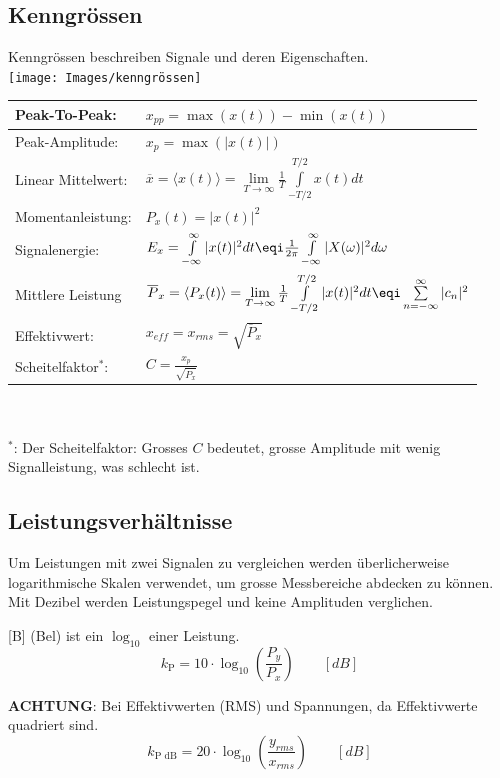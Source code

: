 \subsection{Kenngrössen} 
 Kenngrössen beschreiben Signale und deren Eigenschaften.\\
\texttt{[image: Images/kenngrössen]}

\begin{tabular}{m{3cm} m{5cm}}
		Peak-To-Peak: & $x_{pp} = \max(x(t)) - \min(x(t))$ \\ \midrule
		Peak-Amplitude: & $x_p = \max(|x(t)|)$ \\\midrule
		Linear Mittelwert: & $\overline{x} = \langle x(t)\rangle = \lim\limits_{T\rightarrow\infty}\frac{1}{T}\int\limits_{-T/2}^{T/2}x(t)dt$ \\\midrule
		Momentanleistung: & $P_x(t) = |x(t)|^2$ \\\midrule
		Signalenergie: & $E_x = \int\limits_{-\infty}^{\infty}|x(t)|^2 dt \eqi \frac{1}{2\pi}\int\limits_{-\infty}^{\infty}|X(\omega)|^2d\omega$ \\\midrule
		Mittlere Leistung & $\overline{P}_x = \langle P_x(t)\rangle = \lim\limits_{T\rightarrow\infty}\frac{1}{T}\int\limits_{-T/2}^{T/2}|x(t)|^2dt \eqi \sum\limits_{n=-\infty}^{\infty}|c_n|^2$  \\\midrule
		Effektivwert: & $x_{eff} = x_{rms} = \sqrt{\overline{P}_x}$ \\\midrule
		Scheitelfaktor$^*$: & $C = \frac{x_p}{\sqrt{\overline{P}_x}}$
\end{tabular}
~\\ \\
$^*$: Der Scheitelfaktor: Grosses $C$ bedeutet, grosse Amplitude mit wenig Signalleistung, was schlecht ist.


\subsection{Leistungsverhältnisse}
Um Leistungen mit zwei Signalen zu vergleichen werden überlicherweise logarithmische Skalen verwendet, um grosse Messbereiche abdecken zu können. Mit Dezibel werden Leistungspegel und keine Amplituden verglichen.

[B] (Bel) ist ein $\log_{10}$ einer Leistung.
\[k_{\text{P}} = 10 \cdot \log_{10}\left(\frac{P_y}{P_x}\right) \qquad [dB]\]

\textbf{ACHTUNG}: Bei Effektivwerten (RMS) und Spannungen, da Effektivwerte quadriert sind.
\[k_{\text{P dB}} = 20 \cdot \log_{10}\left(\frac{y_{rms}}{x_{rms}}\right) \qquad [dB]\]

